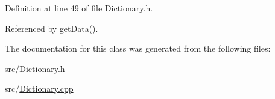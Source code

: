 Definition at line 49 of file Dictionary.\-h.



Referenced by get\-Data().



The documentation for this class was generated from the following files\-:\begin{DoxyCompactItemize}
\item 
src/\hyperlink{Dictionary_8h}{Dictionary.\-h}\item 
src/\hyperlink{Dictionary_8cpp}{Dictionary.\-cpp}\end{DoxyCompactItemize}
